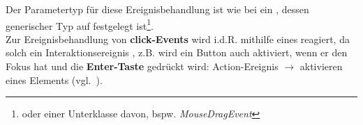 \noindent
Der Parametertyp für diese Ereignisbehandlung ist wie bei  ein , dessen generischer Typ auf  festgelegt ist\footnote{
    oder einer Unterklasse davon, bspw. \textit{MouseDragEvent}
}.\\

\noindent
Zur Ereignisbehandlung von \textbf{click-Events} wird i.d.R. mithilfe eines  reagiert, da solch ein Interaktionsereignis , z.B. wird ein Button auch aktiviert, wenn er den Fokus hat und die \textbf{Enter-Taste} gedrückt wird:  Action-Ereignis $\rightarrow$ aktivieren eines Elements (vgl.~\cite[220]{Oec22}).


